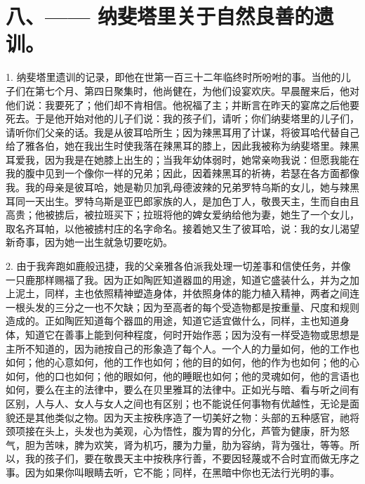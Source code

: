 
\section{八、—— 纳斐塔里关于自然良善的遗训。}

1. 纳斐塔里遗训的记录，即他在世第一百三十二年临终时所吩咐的事。当他的儿子们在第七个月、第四日聚集时，他尚健在，为他们设宴欢庆。早晨醒来后，他对他们说：我要死了；他们却不肯相信。他祝福了主；并断言在昨天的宴席之后他要死去。于是他开始对他的儿子们说：我的孩子们，请听；你们纳斐塔里的儿子们，请听你们父亲的话。我是从彼耳哈所生；因为辣黑耳用了计谋，将彼耳哈代替自己给了雅各伯，她在我出生时使我落在辣黑耳的膝上，因此我被称为纳斐塔里。辣黑耳爱我，因为我是在她膝上出生的；当我年幼体弱时，她常亲吻我说：但愿我能在我的腹中见到一个像你一样的兄弟；因此，因着辣黑耳的祈祷，若瑟在各方面都像我。我的母亲是彼耳哈，她是勒贝加乳母德波辣的兄弟罗特乌斯的女儿，她与辣黑耳同一天出生。罗特乌斯是亚巴郎家族的人，是加色丁人，敬畏天主，生而自由且高贵；他被掳后，被拉班买下；拉班将他的婢女爱纳给他为妻，她生了一个女儿，取名齐耳帕，以他被掳村庄的名字命名。接着她又生了彼耳哈，说：我的女儿渴望新奇事，因为她一出生就急切要吃奶。\par

2. 由于我奔跑如鹿般迅捷，我的父亲雅各伯派我处理一切差事和信使任务，并像一只鹿那样赐福了我。因为正如陶匠知道器皿的用途，知道它盛装什么，并为之加上泥土，同样，主也依照精神塑造身体，并依照身体的能力植入精神，两者之间连一根头发的三分之一也不欠缺；因为至高者的每个受造物都是按重量、尺度和规则造成的。正如陶匠知道每个器皿的用途，知道它适宜做什么，同样，主也知道身体，知道它在善事上能到何种程度，何时开始作恶；因为没有一样受造物或思想是主所不知道的，因为祂按自己的形象造了每个人。一个人的力量如何，他的工作也如何；他的心意如何，他的工作也如何；他的目的如何，他的作为也如何；他的心如何，他的口也如何；他的眼如何，他的睡眠也如何；他的灵魂如何，他的言语也如何，要么在主的法律中，要么在贝里雅耳的法律中。正如光与暗、看与听之间有区别，人与人、女人与女人之间也有区别；也不能说任何事物有优越性，无论是面貌还是其他类似之物。因为天主按秩序造了一切美好之物：头部的五种感官，祂将颈项接在头上，头发也为美观，心为悟性，腹为胃的分化，芦管为健康，肝为怒气，胆为苦味，脾为欢笑，肾为机巧，腰为力量，肋为容纳，背为强壮，等等。所以，我的孩子们，要在敬畏天主中按秩序行善，不要因轻蔑或不合时宜而做无序之事。因为如果你叫眼睛去听，它不能；同样，在黑暗中你也无法行光明的事。\par

